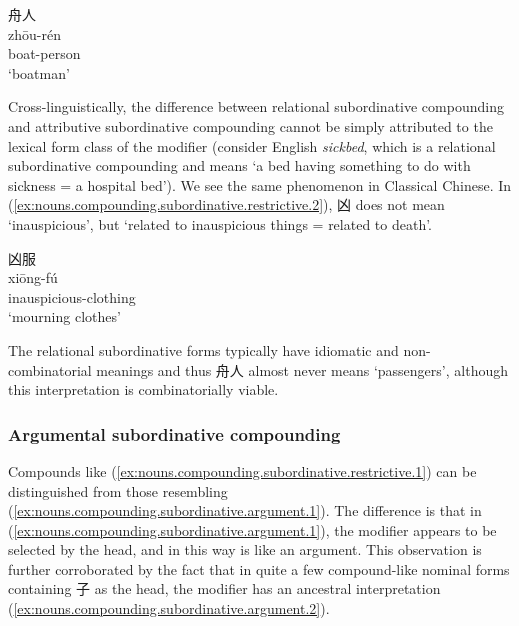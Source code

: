 \documentclass[UTF8, a4paper, oneside, scheme=plain, 12pt]{ctexrep}
\newcommand{\form}[1]{\emph{#1}}
\newcommand{\translate}[1]{`#1'}
\begin{document}
\begin{exe}
    \ex\label{ex:nouns.compounding.subordinative.restrictive.1}
    \glll 舟人 \\
    zhōu-rén \\
    boat-person \\
    \glt\translate{boatman}
\end{exe}

Cross-linguistically, the difference between relational subordinative compounding and attributive subordinative compounding cannot be simply attributed to the lexical form class of the modifier
(consider English \form{sickbed}, which is a relational subordinative compounding and means \translate{a bed having something to do with sickness = a hospital bed}).
We see the same phenomenon in Classical Chinese.
In (\ref{ex:nouns.compounding.subordinative.restrictive.2}),
凶 does not mean \translate{inauspicious}, but \translate{related to inauspicious things = related to death}.

\begin{exe}
    \ex\label{ex:nouns.compounding.subordinative.restrictive.2}
    \glll 凶服 \\
    xiōng-fú \\
    inauspicious-clothing \\
    \glt\translate{mourning clothes}
\end{exe}

The relational subordinative forms typically have idiomatic and non-combinatorial meanings 
and thus 舟人 almost never means \translate{passengers},
although this interpretation is combinatorially viable.

\subsubsection{Argumental subordinative compounding}

Compounds like (\ref{ex:nouns.compounding.subordinative.restrictive.1}) can be distinguished from those resembling (\ref{ex:nouns.compounding.subordinative.argument.1}).
The difference is that in (\ref{ex:nouns.compounding.subordinative.argument.1}),
the modifier appears to be selected by the head,
and in this way is like an argument.
This observation is further corroborated by the fact that 
in quite a few compound-like nominal forms containing 子 as the head,
the modifier has an ancestral interpretation (\ref{ex:nouns.compounding.subordinative.argument.2}).
\end{document}
